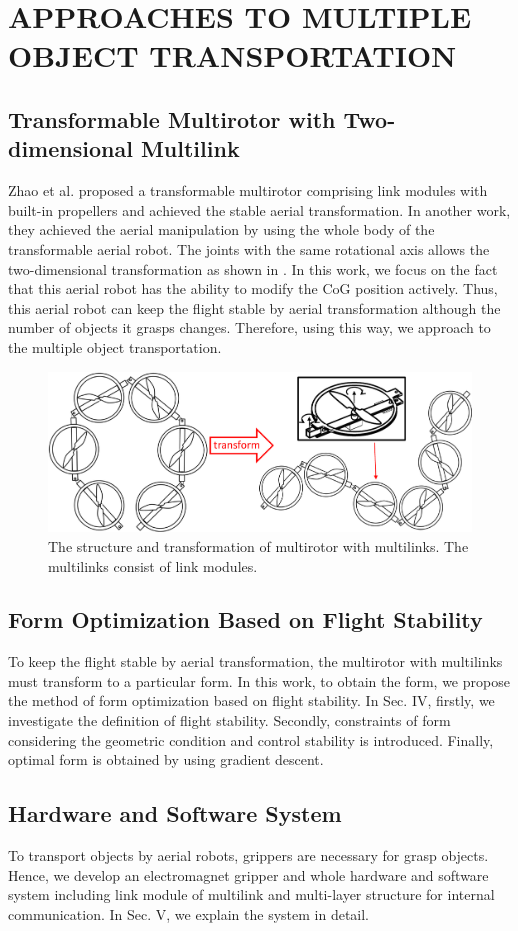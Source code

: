 \section{APPROACHES TO MULTIPLE OBJECT TRANSPORTATION}
\subsection{Transformable Multirotor with Two-dimensional Multilink}
Zhao et al.\cite{Zhao2016} proposed a transformable multirotor comprising link modules with built-in propellers and achieved the stable aerial transformation. In another work\cite{ZhaoICRA2017}, they achieved the aerial manipulation by using the whole body of the transformable aerial robot. The joints with the same rotational axis allows the two-dimensional transformation as shown in . In this work, we focus on the fact that this aerial robot has the ability to modify the CoG position actively. Thus, this aerial robot can keep the flight stable by aerial transformation although the number of objects it grasps changes. Therefore, using this way, we approach to the multiple object transportation.
\begin{figure}[t]
  \begin{center}
    \includegraphics[width=1.0\columnwidth]{figs/multilink.pdf}
  \end{center}
  \caption{The structure and transformation of multirotor with multilinks. The multilinks consist of link modules.\label{figure:multi_link}}
\end{figure}
 
\subsection{Form Optimization Based on Flight Stability}
To keep the flight stable by aerial transformation, the multirotor with multilinks must transform to a particular form. In this work, to obtain the form, we propose the method of form optimization based on flight stability. In Sec. IV, firstly, we investigate the definition of flight stability. Secondly, constraints of form considering the geometric condition and control stability is introduced. Finally, optimal form is obtained by using gradient descent.
  
\subsection{Hardware and Software System}
To transport objects by aerial robots, grippers are necessary for grasp objects. Hence, we develop an electromagnet gripper and whole hardware and software system including link module of multilink and multi-layer structure for internal communication. In Sec. V, we explain the system in detail.
